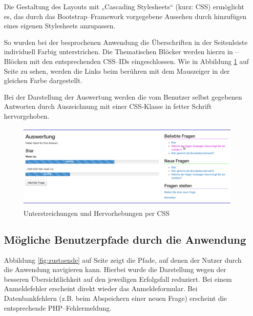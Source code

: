 Die Gestaltung des Layouts mit „Cascading Stylesheets“ (kurz: CSS) ermöglicht es, das durch das Bootstrap--Framework vorgegebene Aussehen durch hinzufügen eines eigenen Stylesheets anzupassen.

So wurden bei der besprochenen Anwendung die Überschriften in der Seitenleiste individuell Farbig unterstrichen. Die Thematischen Blöcker werden hierzu in --Blöcken mit den entsprechenden CSS--IDs eingeschlossen. Wie in Abbildung \ref{fig:seitenleiste} auf Seite \pageref{fig:seitenleiste} zu sehen, werden die Links beim berühren mit dem Mauszeiger in der gleichen Farbe dargestellt.

Bei der Darstellung der Auswertung werden die vom Benutzer selbst gegebenen Antworten durch Auszeichnung mit einer CSS-Klasse in fetter Schrift hervorgehoben. 

\begin{figure}[h]
\begin{center}
\includegraphics[width=\textwidth]{seitenleiste.jpg}
\caption{Unterstreichungen und Hervorhebungen per CSS}
\label{fig:seitenleiste}
\end{center}
\end{figure}

\subsection{Mögliche Benutzerpfade durch die Anwendung}

Abbildung \ref{fig:zustaende} auf Seite \pageref{fig:zustaende} zeigt die Pfade, auf denen der Nutzer durch die Anwendung navigieren kann. Hierbei wurde die Darstellung wegen der besseren Übersichtlichkeit auf den jeweiligen Erfolgsfall reduziert. Bei einem Anmeldefehler erscheint direkt wieder das Anmeldeformular. Bei Datenbankfehlern (z.B. beim Abspeichern einer neuen Frage) erscheint die entsprechende PHP--Fehlermeldung.

